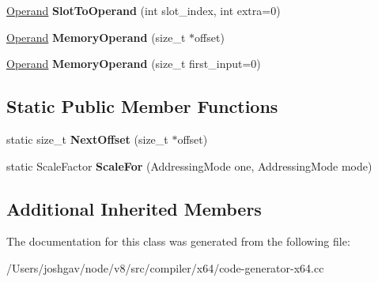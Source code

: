 \begin{DoxyCompactItemize}
\item 
\hyperlink{classv8_1_1internal_1_1_operand}{Operand} {\bfseries Slot\+To\+Operand} (int slot\+\_\+index, int extra=0)\hypertarget{classv8_1_1internal_1_1compiler_1_1_x64_operand_converter_a8b94e0e0eb911d5ef28ec6952b6337f3}{}\label{classv8_1_1internal_1_1compiler_1_1_x64_operand_converter_a8b94e0e0eb911d5ef28ec6952b6337f3}

\item 
\hyperlink{classv8_1_1internal_1_1_operand}{Operand} {\bfseries Memory\+Operand} (size\+\_\+t $\ast$offset)\hypertarget{classv8_1_1internal_1_1compiler_1_1_x64_operand_converter_a9aca54539686848edaebff0f65a4db0d}{}\label{classv8_1_1internal_1_1compiler_1_1_x64_operand_converter_a9aca54539686848edaebff0f65a4db0d}

\item 
\hyperlink{classv8_1_1internal_1_1_operand}{Operand} {\bfseries Memory\+Operand} (size\+\_\+t first\+\_\+input=0)\hypertarget{classv8_1_1internal_1_1compiler_1_1_x64_operand_converter_aa935da453c62493798e8eef04731932e}{}\label{classv8_1_1internal_1_1compiler_1_1_x64_operand_converter_aa935da453c62493798e8eef04731932e}

\end{DoxyCompactItemize}
\subsection*{Static Public Member Functions}
\begin{DoxyCompactItemize}
\item 
static size\+\_\+t {\bfseries Next\+Offset} (size\+\_\+t $\ast$offset)\hypertarget{classv8_1_1internal_1_1compiler_1_1_x64_operand_converter_ac3c0d6ddc701962daffed262f2149cb9}{}\label{classv8_1_1internal_1_1compiler_1_1_x64_operand_converter_ac3c0d6ddc701962daffed262f2149cb9}

\item 
static Scale\+Factor {\bfseries Scale\+For} (Addressing\+Mode one, Addressing\+Mode mode)\hypertarget{classv8_1_1internal_1_1compiler_1_1_x64_operand_converter_a77fc33a8abe1736b250d26e9d75efb28}{}\label{classv8_1_1internal_1_1compiler_1_1_x64_operand_converter_a77fc33a8abe1736b250d26e9d75efb28}

\end{DoxyCompactItemize}
\subsection*{Additional Inherited Members}


The documentation for this class was generated from the following file\+:\begin{DoxyCompactItemize}
\item 
/\+Users/joshgav/node/v8/src/compiler/x64/code-\/generator-\/x64.\+cc\end{DoxyCompactItemize}
